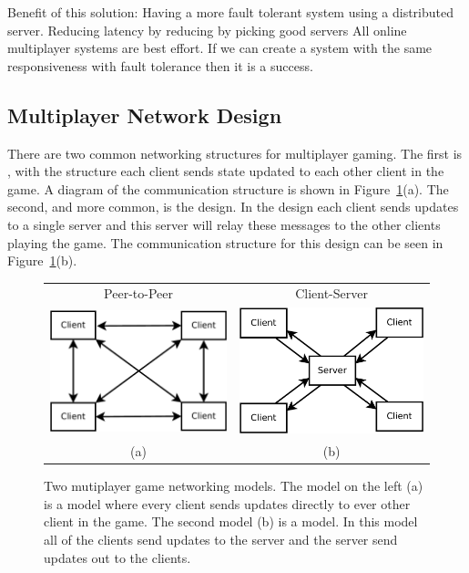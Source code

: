 Benefit of this solution:
Having a more fault tolerant system using a distributed server. 
Reducing latency by reducing by picking good servers
All online multiplayer systems are best effort. If we can create a system with the same responsiveness with fault tolerance then it is a success.

\subsection{Multiplayer Network Design}

	There are two common networking structures for multiplayer gaming. The first is \ptoP, with the structure each client sends state updated to each other client in the game. A diagram of the \ptoP communication structure is shown in Figure~\ref{figure:p2p-vs-ClientServer}(a).
	The second, and more common, is the \clientServer design. In the \clientServer design each client sends updates to a single server and this server will relay these messages to the other clients playing the game. The communication structure for this design can be seen in Figure~\ref{figure:p2p-vs-ClientServer}(b).
	
\begin{figure}[ht]
	\centering
	\begin{tabular}{c c}
		Peer-to-Peer & Client-Server \\
		\includegraphics[width=0.48\linewidth]{../images/p2p-model-crop.pdf} &
		\includegraphics[width=0.48\linewidth]{../images/client-server-model-crop.pdf} \\
		(a) & (b)
	\end{tabular}

	\caption{\label{figure:p2p-vs-ClientServer} Two mutiplayer game networking models. The model on the left (a) is a \ptoP model where every client sends updates directly to ever other client in the game. The second model (b) is a \clientServer model. In this model all of the clients send updates to the server and the server send updates out to the clients.}
	\end{figure}
	
